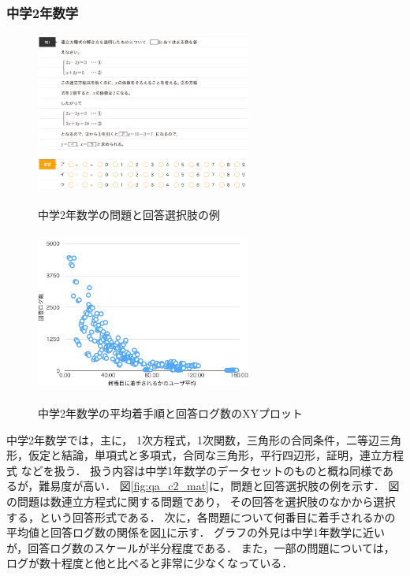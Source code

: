 \subsubsection{中学2年数学}
\begin{figure}[ht]
\begin{center}
	\includegraphics[width=200pt, height=150pt]{./img/qa_c2_mat.png}
	\caption{中学2年数学の問題と回答選択肢の例}
	\label{fig:qa_c2_mat}
\endminipage\hfill
{}
	\includegraphics[width=200pt, height=150pt]{./img/stats_c2_mat.pdf}
	\caption{中学2年数学の平均着手順と回答ログ数のXYプロット}
	\label{fig:stats_c2_mat}
\endminipage\hfill
\end{center}
\end{figure}
中学2年数学では，主に，
1次方程式，1次関数，三角形の合同条件，二等辺三角形，仮定と結論，単項式と多項式，合同な三角形，平行四辺形，証明，連立方程式
などを扱う．
扱う内容は中学1年数学のデータセットのものと概ね同様であるが，難易度が高い．
図\ref{fig:qa_c2_mat}に，問題と回答選択肢の例を示す．
図の問題は数連立方程式に関する問題であり，
その回答を選択肢のなかから選択する，という回答形式である．
次に，各問題について何番目に着手されるかの平均値と回答ログ数の関係を図\ref{fig:stats_c2_mat}に示す．
グラフの外見は中学1年数学に近いが，回答ログ数のスケールが半分程度である．
また，一部の問題については，ログが数十程度と他と比べると非常に少なくなっている．


